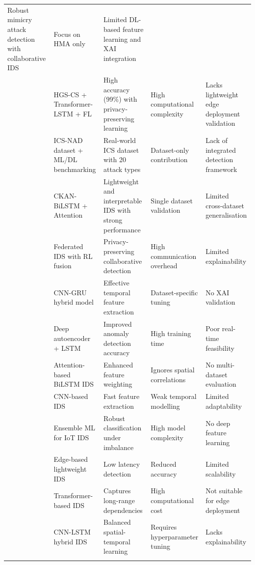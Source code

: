 \documentclass[a4paper,fleqn]{cas-sc}
\begin{document}
{\begin{landscape}
\begin{longtable}{p{4cm}p{4cm}p{4cm}p{4cm}p{4cm}}
  Robust mimicry attack detection with collaborative IDS &
  Focus on HMA only &
  Limited DL-based feature learning and XAI integration \\
\cite{fraihat2026hybrid} &
  HGS-CS + Transformer-LSTM + FL &
  High accuracy (99\%) with privacy-preserving learning &
  High computational complexity &
  Lacks lightweight edge deployment validation \\
\cite{zhou2026icsnad} &
  ICS-NAD dataset + ML/DL benchmarking &
  Real-world ICS dataset with 20 attack types &
  Dataset-only contribution &
  Lack of integrated detection framework \\
\cite{elwhishi2026ckan} &
  CKAN-BiLSTM + Attention &
  Lightweight and interpretable IDS with strong performance &
  Single dataset validation &
  Limited cross-dataset generalisation \\
\cite{khan2024federated} &
  Federated IDS with RL fusion &
  Privacy-preserving collaborative detection &
  High communication overhead &
  Limited explainability \\
\cite{ullah2023iotids} &
  CNN-GRU hybrid model &
  Effective temporal feature extraction &
  Dataset-specific tuning &
  No XAI validation \\
\cite{vijayan2023automated} &
  Deep autoencoder + LSTM &
  Improved anomaly detection accuracy &
  High training time &
  Poor real-time feasibility \\
\cite{priyadarshini2023attention} &
  Attention-based BiLSTM IDS &
  Enhanced feature weighting &
  Ignores spatial correlations &
  No multi-dataset evaluation \\
\cite{nguyen2022cnn} &
  CNN-based IDS &
  Fast feature extraction &
  Weak temporal modelling &
  Limited adaptability \\
\cite{indra2024ensemble} &
  Ensemble ML for IoT IDS &
  Robust classification under imbalance &
  High model complexity &
  No deep feature learning \\
\cite{Jyothi2024edgeids} &
  Edge-based lightweight IDS &
  Low latency detection &
  Reduced accuracy &
  Limited scalability \\
\cite{zhang2023transformer} &
  Transformer-based IDS &
  Captures long-range dependencies &
  High computational cost &
  Not suitable for edge deployment \\
\cite{poddar2024enhancing} &
  CNN-LSTM hybrid IDS &
  Balanced spatial-temporal learning &
  Requires hyperparameter tuning &
  Lacks explainability \\
\cite{singh2023xai} &

\end{longtable}
\end{landscape}}
\end{document}
